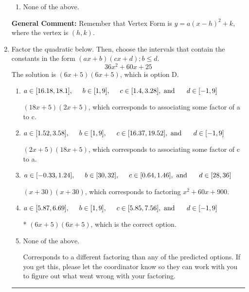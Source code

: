 \documentclass{extbook}[14pt]
\newcommand{\litem}[1]{\item #1

\rule{\textwidth}{0.4pt}}
\begin{document}
\begin{enumerate}
{\begin{enumerate}[label=\Alph*.]
\begin{multicols}{2}
\end{multicols}\item None of the above.\end{enumerate}
\textbf{General Comment:} Remember that Vertex Form is $y = a(x-h)^2+k$, where the vertex is $(h, k)$.
}
\litem{
Factor the quadratic below. Then, choose the intervals that contain the constants in the form $(ax+b)(cx+d); b \leq d.$
\[ 36x^{2} +60 x + 25 \]The solution is \( (6x + 5)(6x + 5) \), which is option D.\begin{enumerate}[label=\Alph*.]
\item \( a \in [16.18, 18.1], \hspace*{5mm} b \in [1, 9], \hspace*{5mm} c \in [1.4, 3.28], \text{ and } \hspace*{5mm} d \in [-1, 9] \)

 $(18x + 5)(2x + 5)$, which corresponds to associating some factor of a to c.
\item \( a \in [1.52, 3.58], \hspace*{5mm} b \in [1, 9], \hspace*{5mm} c \in [16.37, 19.52], \text{ and } \hspace*{5mm} d \in [-1, 9] \)

 $(2x + 5)(18x + 5)$, which corresponds to associating some factor of c to a.
\item \( a \in [-0.33, 1.24], \hspace*{5mm} b \in [30, 32], \hspace*{5mm} c \in [0.64, 1.46], \text{ and } \hspace*{5mm} d \in [28, 36] \)

 $(x + 30)(x + 30)$, which corresponds to factoring $x^{2} +60 x + 900$.
\item \( a \in [5.87, 6.69], \hspace*{5mm} b \in [1, 9], \hspace*{5mm} c \in [5.85, 7.56], \text{ and } \hspace*{5mm} d \in [-1, 9] \)

* $(6x + 5)(6x + 5)$, which is the correct option.
\item \( \text{None of the above.} \)

 Corresponds to a different factoring than any of the predicted options. If you get this, please let the coordinator know so they can work with you to figure out what went wrong with your factoring.
\end{enumerate}

}
\end{enumerate}
\end{document}

